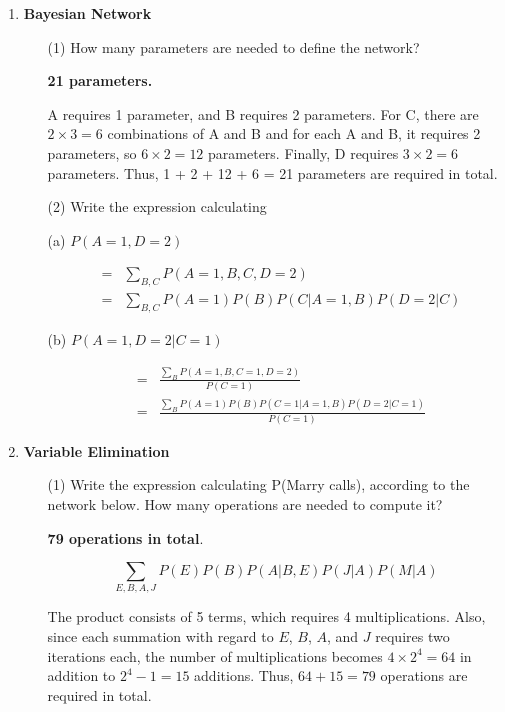 \begin{enumerate}
\begin{enumerate}
\end{enumerate}

\item {\bf Bayesian Network}
\begin{enumerate}

\item[(1)] How many parameters are needed to define the network?

{\bf 21 parameters.}

A requires 1 parameter, and B requires 2 parameters. For C, there are $2 \times 3 = 6$ combinations of A and B and for each A and B, it requires 2 parameters, so $6 \times 2 = 12$ parameters. Finally, D requires $3 \times 2 = 6$ parameters. Thus, 1 + 2 + 12 + 6 = 21 parameters are required in total.

\item[(2)] Write the expression calculating 

(a) $P(A=1, D=2)$ 

\begin{eqnarray}
& = & \sum_{B,C} P(A=1,B,C,D=2) \nonumber \\
& = & \sum_{B,C} P(A=1)P(B)P(C|A=1,B)P(D=2|C) \nonumber
\end{eqnarray}

(b) $P(A=1,D=2|C=1)$

\begin{eqnarray}
& = & \frac{\sum_B P(A=1,B,C=1,D=2)}{P(C=1)} \nonumber \\
& = & \frac{\sum_B P(A=1)P(B)P(C=1|A=1,B)P(D=2|C=1)}{P(C=1)} \nonumber
\end{eqnarray}

\end{enumerate}

\item {\bf Variable Elimination}

\begin{enumerate}

\item[(1)] Write the expression calculating P(Marry calls), according to the network below. How many operations are needed to compute it?

{\bf 79 operations in total}.

\[
\sum_{E,B,A,J} P(E)P(B)P(A|B,E)P(J|A)P(M|A)
\]

The product consists of 5 terms, which requires 4 multiplications. Also, since each summation with regard to $E$, $B$, $A$, and $J$ requires two iterations each, the number of multiplications becomes $4 \times 2^4 = 64$ in addition to $2^4-1=15$ additions. Thus, $64+15=79$ operations are required in total.


\end{enumerate}
\end{enumerate}
